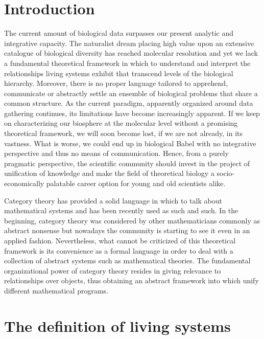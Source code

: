 \documentclass[aps,twocolumn]{revtex4-1}
\begin{document}
\tableofcontents

\section{Introduction}

The current amount of biological data surpasses our present analytic and integrative capacity. The naturalist dream placing high value upon an extensive catalogue of biological diversity has reached molecular resolution and yet we lack a fundamental theoretical framework in which to understand and interpret the relationships living systems exhibit that transcend levels of the biological hierarchy. Moreover, there is no proper language tailored to apprehend, communicate or abstractly settle an ensemble of biological problems that share a common structure. As the current paradigm, apparently organized around data gathering continues, its limitations have become increasingly apparent. If we keep on characterizing our biosphere at the molecular level without a promising theoretical framework, we will soon become lost, if we are not already, in its vastness. What is worse, we could end up in biological Babel with no integrative perspective and thus no means of communication. Hence, from a purely pragmatic perspective, the scientific community should invest in the project of unification of knowledge and make the field of theoretical biology a socio-economically palatable career option for young and old scientists alike. 

Category theory has provided a solid language in which to talk about mathematical systems and has been recently used as such and such. In the beginning, category theory was considered by other mathematicians commonly as abstract nonsense but nowadays the community is starting to see it even in an applied fashion. Nevertheless, what cannot be criticized of this theoretical framework is its convenience as a formal language in order to deal with a collection of abstract systems such as mathematical theories. The fundamental organizational power of category theory resides in giving relevance to relationships over objects, thus obtaining an abstract framework into which unify different mathematical programs.

\section{The definition of living systems}
\end{document}
